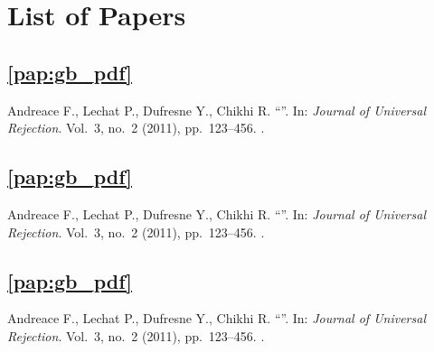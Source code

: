 \chapter{List of Papers}


\section*{\cref{pap:gb_pdf}}
Andreace F., Lechat P., Dufresne Y., Chikhi R.
\enquote{}.
In: \emph{Journal of Universal Rejection}.
Vol.\ 3,
no.\ 2
(2011),
pp.~123--456.
.


\section*{\cref{pap:gb_pdf}}
Andreace F., Lechat P., Dufresne Y., Chikhi R.
\enquote{}.
In: \emph{Journal of Universal Rejection}.
Vol.\ 3,
no.\ 2
(2011),
pp.~123--456.
.


\section*{\cref{pap:gb_pdf}}
Andreace F., Lechat P., Dufresne Y., Chikhi R.
\enquote{}.
In: \emph{Journal of Universal Rejection}.
Vol.\ 3,
no.\ 2
(2011),
pp.~123--456.
.





